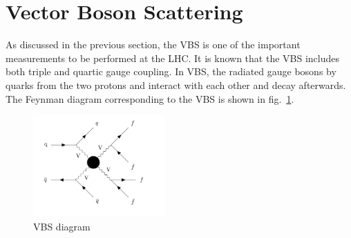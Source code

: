


\section{Vector Boson Scattering} %
\label{sec:vector_boson_scattering}
As discussed in the previous section, the VBS is one of the important measurements to be performed at the LHC. It is known that the VBS includes both triple and quartic gauge coupling. In VBS, the radiated gauge bosons by quarks from the two protons and interact with each other and decay afterwards. The Feynman diagram corresponding to the VBS is shown in fig.~\ref{fig:VBF_vv_vv}.
\begin{figure}[!htbp]
    \centering
    \includegraphics[width=0.45\textwidth]{Pictures/VBF_VV_VV.png}
    \caption{VBS diagram}
    \label{fig:VBF_vv_vv}
\end{figure}

